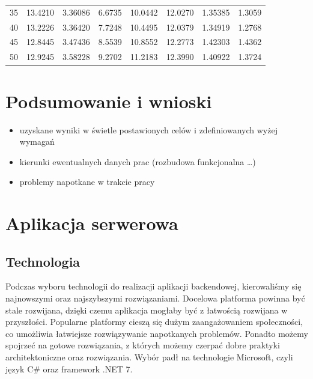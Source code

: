 \documentclass[a4paper,twoside,12pt]{book}
\begin{document}
\begin{table}
\begin{tabular}{rrrrrrrr}
	      35 & 13.4210 & 3.36086 &       6.6735 &    10.0442 &    12.0270 & 1.35385 &                       1.3059 \\
	      40 & 13.2226 & 3.36420 &       7.7248 &    10.4495 &    12.0379 & 1.34919 &                       1.2768 \\
	      45 & 12.8445 & 3.47436 &       8.5539 &    10.8552 &    12.2773 & 1.42303 &                       1.4362 \\
	      50 & 12.9245 & 3.58228 &       9.2702 &    11.2183 &    12.3990 & 1.40922 &                       1.3724 \\
\bottomrule
\end{tabular}
\end{table}  










\chapter{Podsumowanie i wnioski}
\begin{itemize}
\item uzyskane wyniki w świetle postawionych celów i zdefiniowanych wyżej wymagań
\item kierunki ewentualnych danych prac (rozbudowa funkcjonalna …)
\item problemy napotkane w trakcie pracy
\end{itemize}

\chapter{Aplikacja serwerowa}
\section{Technologia}
Podczas wyboru technologii do realizacji aplikacji backendowej, kierowaliśmy się najnowszymi oraz najszybszymi rozwiązaniami. Docelowa platforma powinna być stale rozwijana, dzięki czemu aplikacja mogłaby być z łatwością rozwijana w przyszłości. Popularne platformy cieszą się dużym zaangażowaniem społeczności, co umożliwia łatwiejsze rozwiązywanie napotkanych problemów. Ponadto możemy spojrzeć na gotowe rozwiązania, z których możemy czerpać dobre praktyki architektoniczne oraz rozwiązania. Wybór padł na technologie Microsoft, czyli język C\# oraz framework .NET 7.  
\end{document}
